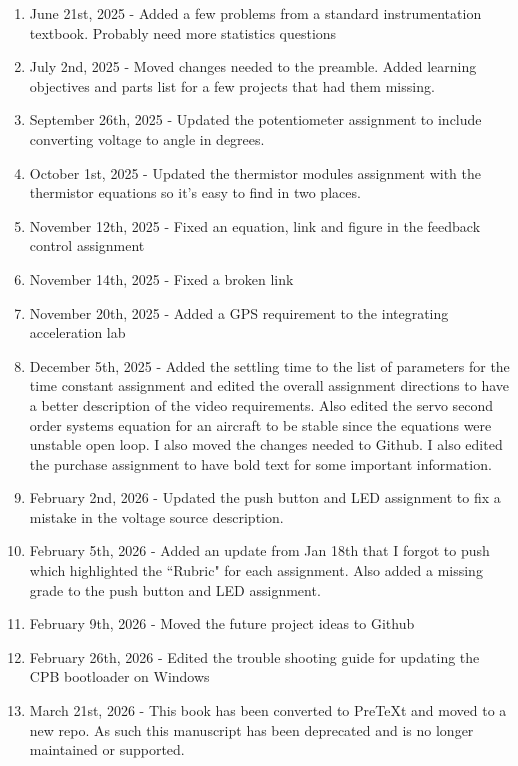 \documentclass{article}
\begin{document}
\begin{enumerate}[itemsep=-5pt]
\item June 21st, 2025 - Added a few problems from a standard instrumentation textbook. Probably need more statistics questions
\item July 2nd, 2025 - Moved changes needed to the preamble. Added learning objectives and parts list for a few projects that had them missing.
\item September 26th, 2025 - Updated the potentiometer assignment to include converting voltage to angle in degrees.
\item October 1st, 2025 - Updated the thermistor modules assignment with the thermistor equations so it's easy to find in two places.
\item November 12th, 2025 - Fixed an equation, link and figure in the feedback control assignment
\item November 14th, 2025 - Fixed a broken link
\item November 20th, 2025 - Added a GPS requirement to the integrating acceleration lab
\item December 5th, 2025 - Added the settling time to the list of parameters for the time constant assignment and edited the overall assignment directions to have a better description of the video requirements. Also edited the servo second order systems equation for an aircraft to be stable since the equations were unstable open loop. I also moved the changes needed to Github. I also edited the purchase assignment to have bold text for some important information.
\item February 2nd, 2026 - Updated the push button and LED assignment to fix a mistake in the voltage source description.
\item February 5th, 2026 - Added an update from Jan 18th that I forgot to push which highlighted the ``Rubric" for each assignment. Also added a missing grade to the push button and LED assignment.
\item February 9th, 2026 - Moved the future project ideas to Github
\item February 26th, 2026 - Edited the trouble shooting guide for
  updating the CPB bootloader on Windows
\item March 21st, 2026 - This book has been converted to PreTeXt and
  moved to a new repo. As such this manuscript has been deprecated and
  is no longer maintained or supported.
\end{enumerate}
\end{document}
